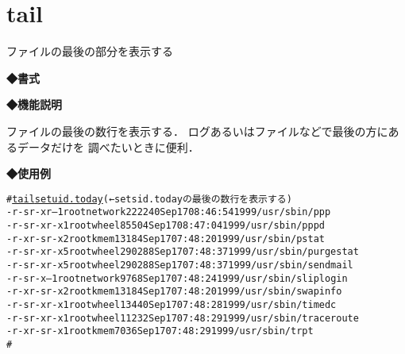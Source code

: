 
\section{tail}
ファイルの最後の部分を表示する\par
\label{cmd:tail}
\noindent
{\bf ◆書式}
\begin{center}
\begin{screen}
\begin{alltt}
% tail ファイル名
\end{alltt}
\end{screen}
\end{center}

\noindent
{\bf ◆機能説明}

ファイルの最後の数行を表示する．
ログあるいはファイルなどで最後の方にあるデータだけを
調べたいときに便利．\par

\noindent
{\bf ◆使用例}
\begin{center}
\begin{breakbox}
\begin{alltt}
# \underline{tail setuid.today} (← setsid.today の最後の数行を表示する)
-r-sr-xr--  1 root  network  222240 Sep 17 08:46:54 1999 /usr/sbin/ppp
-r-sr-xr-x  1 root  wheel     85504 Sep 17 08:47:04 1999 /usr/sbin/pppd
-r-xr-sr-x  2 root  kmem      13184 Sep 17 07:48:20 1999 /usr/sbin/pstat
-r-sr-xr-x  5 root  wheel    290288 Sep 17 07:48:37 1999 /usr/sbin/purgestat
-r-sr-xr-x  5 root  wheel    290288 Sep 17 07:48:37 1999 /usr/sbin/sendmail
-r-sr-x---  1 root  network    9768 Sep 17 07:48:24 1999 /usr/sbin/sliplogin
-r-xr-sr-x  2 root  kmem      13184 Sep 17 07:48:20 1999 /usr/sbin/swapinfo
-r-sr-xr-x  1 root  wheel     13440 Sep 17 07:48:28 1999 /usr/sbin/timedc
-r-sr-xr-x  1 root  wheel     11232 Sep 17 07:48:29 1999 /usr/sbin/traceroute
-r-xr-sr-x  1 root  kmem       7036 Sep 17 07:48:29 1999 /usr/sbin/trpt
#
\end{alltt}
\end{breakbox}
\end{center}
\clearpage
